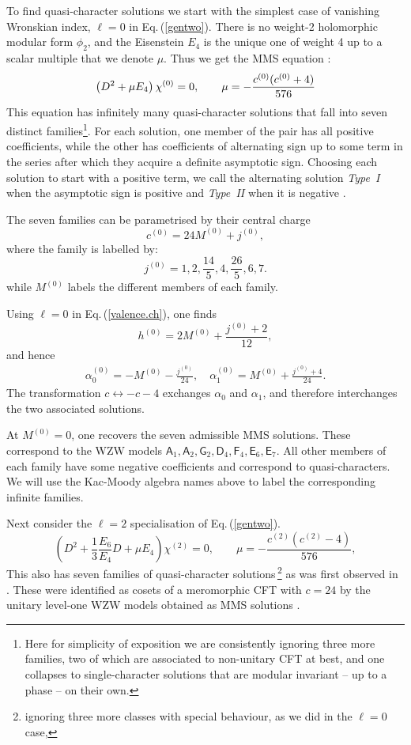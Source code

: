 \documentclass[11pt]{article}
\newcommand\be{\begin{equation}}
\newcommand\ee{\end{equation}}
\newcommand\mA{{\mathsf A}}
\newcommand\mD{{\mathsf D}}
\newcommand\mE{{\mathsf E}}
\newcommand\mF{{\mathsf F}}
\newcommand\mG{{\mathsf G}}
\newcommand{\eref}[1]{Eq.\,(\ref{#1})}
\begin{document}
To find quasi-character solutions we start with the simplest case of vanishing Wronskian index, $\ell=0$ in \eref{gentwo}. There is no weight-2 holomorphic modular form $\phi_2$, and the Eisenstein $E_4$ is the unique one of weight 4 up to a scalar multiple that we denote $\mu$. Thus we get the MMS equation \cite{Mathur:1988na}:
\be
\left(D^2+\mu E_4\right)\chi^{(0)} =0,
\qquad
\mu=-\frac{c^{(0)}(c^{(0)}+4)}{576}\\[2mm]
\label{2ell0}
\ee
This equation has infinitely many quasi-character solutions that fall into seven distinct families\footnote{Here for simplicity of exposition we are consistently ignoring three more families, two of which are associated to non-unitary CFT at best, and one collapses to single-character solutions that are modular invariant -- up to a phase -- on their own.}. For each solution, one member
of the pair has all positive coefficients, while the other has coefficients of alternating sign up to some term in the series after which they acquire a definite asymptotic sign. Choosing each solution to start with a positive term, we call the alternating solution {\it Type~I} when the asymptotic sign is positive and {\it Type~II} when it is negative \cite{Chandra:2018pjq, Das:2025gto}. 

The seven families can be parametrised by their central charge \cite{Das:2025gto}
\be
c^{(0)}=24M^{(0)}+j^{(0)},
\label{cqcell.0}
\ee
where the family is labelled by:
\be
j^{(0)}=1,2,\frac{14}{5},4,\frac{26}{5},6,7.
\label{jvalell.0}
\ee
while $M^{(0)}$ labels the different members of each family.

Using $\ell=0$ in \eref{valence.ch}, one finds
\[
h^{(0)}=2M^{(0)}+\frac{j^{(0)}+2}{12},
\]
and hence
\be
\begin{split}
\alpha_0^{(0)}=-M^{(0)}-\frac{j^{(0)}}{24},\quad \alpha_1^{(0)}=M^{(0)}+\frac{j^{(0)}+4}{24}.
\end{split}
\label{exps.0}
\ee
The transformation $c\leftrightarrow-c-4$ exchanges $\alpha_0$ and
$\alpha_1$, and therefore interchanges the two associated solutions.

At $M^{(0)}=0$, one recovers the seven admissible MMS solutions. These correspond to the WZW models $\mA_1, \mA_2, \mG_2, \mD_4, \mF_4, \mE_6, \mE_7$. All other members of each family have some negative coefficients and correspond to quasi-characters. We will use the Kac-Moody algebra names above to label the corresponding infinite families. 

Next consider the $\ell=2$ specialisation of \eref{gentwo}.
\be
\left(D^2+\frac13 \frac{E_6}{E_4}D +\mu E_4\right)\chi^{(2)} = 0,\qquad \mu=-\frac{c^{(2)}(c^{(2)}-4)}{576},
\label{2ell2}
\ee
This also has seven families of quasi-character solutions\,\footnote{ignoring three more classes with special behaviour, as we did in the $\ell=0$ case,} as was first observed in \cite{Hampapura:2015cea}. These were identified as cosets of a meromorphic CFT with $c=24$ by the unitary level-one WZW models obtained as MMS solutions \cite{Gaberdiel:2016zke}.
\end{document}
